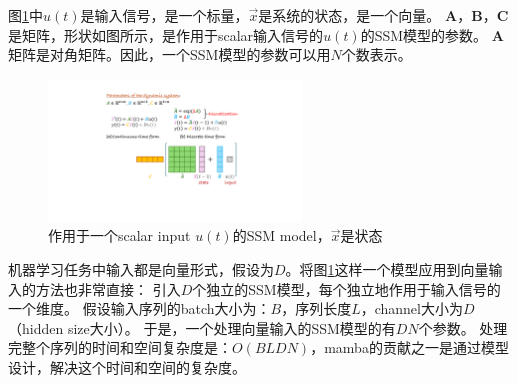 图\ref{fig:ssm-overview}中$u(t)$是输入信号，是一个标量，$\vec{x}$是系统的状态，是一个向量。
$\mathbf{A}$，$\mathbf{B}$，$\mathbf{C}$是矩阵，形状如图所示，是作用于scalar输入信号的$u(t)$的SSM模型的参数。
$\mathbf{A}$矩阵是对角矩阵。因此，一个SSM模型的参数可以用$N$个数表示。

\begin{figure}[h]
  \centering
  \includegraphics[width=0.6\textwidth]{figures/SSM-overview.pdf}
  \caption{作用于一个scalar input $u(t)$的SSM model，$\vec{x}$是状态}\label{fig:ssm-overview}
\end{figure}

机器学习任务中输入都是向量形式，假设为$D$。将图\ref{fig:ssm-overview}这样一个模型应用到向量输入的方法也非常直接：
引入$D$个独立的SSM模型，每个独立地作用于输入信号的一个维度。
假设输入序列的batch大小为：$B$，序列长度$L$，channel大小为$D$ （hidden size大小）。
于是，一个处理向量输入的SSM模型的有$DN$个参数。
处理完整个序列的时间和空间复杂度是：$O(BLDN)$，mamba的贡献之一是通过模型设计，解决这个时间和空间的复杂度。

